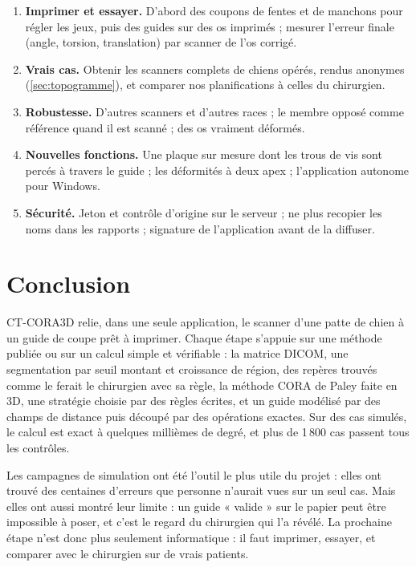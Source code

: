 \begin{enumerate}
  \item \textbf{Imprimer et essayer.} D'abord des coupons de fentes et de manchons pour régler les jeux, puis des
  guides sur des os imprimés ; mesurer l'erreur finale (angle, torsion, translation) par scanner de l'os corrigé.
  \item \textbf{Vrais cas.} Obtenir les scanners complets de chiens opérés, rendus anonymes (\cref{sec:topogramme}), et
  comparer nos planifications à celles du chirurgien.
  \item \textbf{Robustesse.} D'autres scanners et d'autres races ; le membre opposé comme référence quand il est
  scanné ; des os vraiment déformés.
  \item \textbf{Nouvelles fonctions.} Une plaque sur mesure dont les trous de vis sont percés à travers le guide
  \cite{carwardine2021} ; les déformités à deux apex ; l'application autonome pour Windows.
  \item \textbf{Sécurité.} Jeton et contrôle d'origine sur le serveur ; ne plus recopier les noms dans les rapports ;
  signature de l'application avant de la diffuser.
\end{enumerate}

\section{Conclusion}

CT-CORA3D relie, dans une seule application, le scanner d'une patte de chien à un guide de coupe prêt à imprimer. Chaque
étape s'appuie sur une méthode publiée ou sur un calcul simple et vérifiable : la matrice DICOM, une segmentation par
seuil montant et croissance de région, des repères trouvés comme le ferait le chirurgien avec sa règle, la méthode CORA
de Paley faite en 3D, une stratégie choisie par des règles écrites, et un guide modélisé par des champs de distance puis
découpé par des opérations exactes. Sur des cas simulés, le calcul est exact à quelques millièmes de degré, et plus de
1\,800 cas passent tous les contrôles.

Les campagnes de simulation ont été l'outil le plus utile du projet : elles ont trouvé des centaines d'erreurs que
personne n'aurait vues sur un seul cas. Mais elles ont aussi montré leur limite : un guide « valide » sur le papier peut
être impossible à poser, et c'est le regard du chirurgien qui l'a révélé. La prochaine étape n'est donc plus seulement
informatique : il faut imprimer, essayer, et comparer avec le chirurgien sur de vrais patients.
